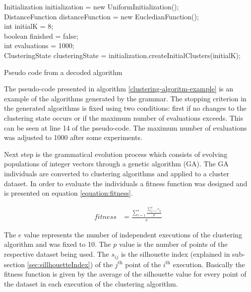 \documentclass[journal]{IEEEtran}
\begin{document}
	\begin{algorithm}[!htb]
		\label{clustering-algoritm-example}
		Initialization initialization = new UniformInitialization(); \\
		DistanceFunction distanceFunction = new EucledianFunction(); \\
		int initialK = 8; \\
		boolean finished = false; \\
		int evaluations = 1000;\\
		ClusteringState 
		clusteringState = initialization.createInitialClusters(initialK); \\
		\caption{Pseudo code from a decoded algorithm}
	\end{algorithm}
	
	The pseudo-code presented in algorithm \ref{clustering-algoritm-example} is an example of the algorithms generated by the grammar. The stopping criterion in the generated algorithms is fixed using two conditions: first if no changes to the clustering state occurs or if the maximum number of evaluations exceeds. This can be seen at line 14 of the pseudo-code. The maximum number of evaluations was adjusted to 1000 after some experiments.
	
	Next step is the grammatical evolution process which consists of evolving populations of integer vectors through a genetic algorithm (GA). The GA individuals are converted to clustering algorithms and applied to a cluster dataset. In order to evaluate the individuals a fitness function was designed and is presented on equation \ref{equation:fitness}.
	
	\begin{align}
	\label{equation:fitness}
	fitness    &= \frac{\sum_{i=1}^e \frac{\sum_{j=1}^{p} s_{ij}}{p}}{e}
	\
	\end{align}
	
	The $e$ value represents the number of independent executions of the clustering algorithm and was fixed to 10. The $p$ value is the number of points of the respective dataset being used. The $s_{ij}$ is the silhouette index (explained in sub-section \ref{sec:sillhouetteIndex}) of the $j^{\text{th}}$ point of the $i^{\text{th}}$ execution. Basically the fitness function is given by the average of the silhouette value for every point of the dataset in each execution of the clustering algorithm.
	
\end{document}
